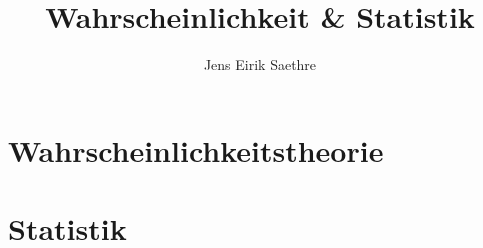 \documentclass[fontsize=7pt]{scrartcl}
\begin{document}
\author{Jens Eirik Saethre}
\title{Wahrscheinlichkeit \& Statistik}




\begin{multicols*}{3}

\part{Wahrscheinlichkeitstheorie}






\part{Statistik}





%



\end{multicols*}
\end{document}
